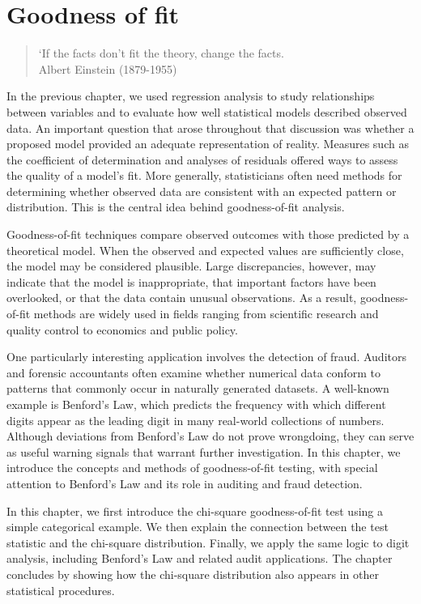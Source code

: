 
\chapter{Goodness of fit} %
\label{cha:goodness_of_fit}

\begin{quote}
`If the facts don't fit the theory, change the facts.\\
Albert Einstein (1879-1955)
\end{quote}

In the previous chapter, we used regression analysis to study relationships between variables and to evaluate how well statistical models described observed data. An important question that arose throughout that discussion was whether a proposed model provided an adequate representation of reality. Measures such as the coefficient of determination and analyses of residuals offered ways to assess the quality of a model's fit. More generally, statisticians often need methods for determining whether observed data are consistent with an expected pattern or distribution. This is the central idea behind goodness-of-fit analysis.

Goodness-of-fit techniques compare observed outcomes with those predicted by a theoretical model. When the observed and expected values are sufficiently close, the model may be considered plausible. Large discrepancies, however, may indicate that the model is inappropriate, that important factors have been overlooked, or that the data contain unusual observations. As a result, goodness-of-fit methods are widely used in fields ranging from scientific research and quality control to economics and public policy.

One particularly interesting application involves the detection of fraud. Auditors and forensic accountants often examine whether numerical data conform to patterns that commonly occur in naturally generated datasets. A well-known example is Benford’s Law, which predicts the frequency with which different digits appear as the leading digit in many real-world collections of numbers. Although deviations from Benford’s Law do not prove wrongdoing, they can serve as useful warning signals that warrant further investigation. In this chapter, we introduce the concepts and methods of goodness-of-fit testing, with special attention to Benford’s Law and its role in auditing and fraud detection.

In this chapter, we first introduce the chi-square goodness-of-fit test using a simple categorical example. We then explain the connection between the test statistic and the chi-square distribution. Finally, we apply the same logic to digit analysis, including Benford's Law and related audit applications. The chapter concludes by showing how the chi-square distribution also appears in other statistical procedures.

